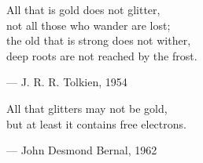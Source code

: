 \begin{flushright}
\begin{hangleftquote}{\QENOpen}{\QENClose}
All that is gold does not glitter,\\
not all those who wander are lost;\\
the old that is strong does not wither,\\
deep roots are not reached by the frost.
\end{hangleftquote}
\par\smallskip
\normalfont — J. R. R. Tolkien, 1954
\end{flushright}
\vspace{2em}
\begin{flushright}
\begin{hangleftquote}{\QENOpen}{\QENClose}
All that glitters may not be gold,\\
but at least it contains free electrons.
\end{hangleftquote}
\par\smallskip
\normalfont — John Desmond Bernal, 1962
\end{flushright}

